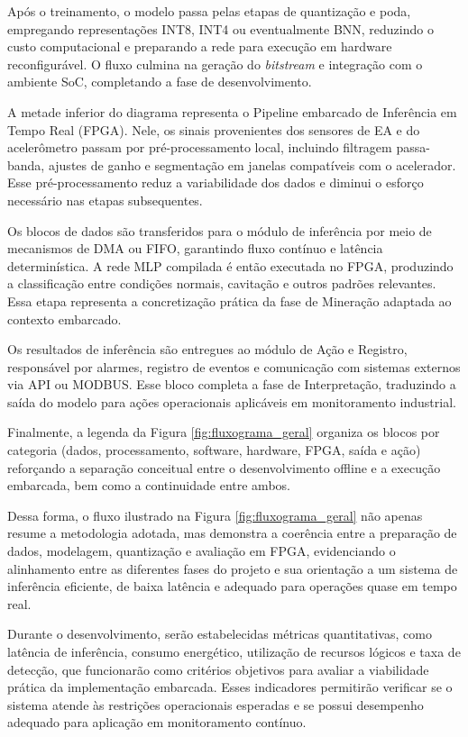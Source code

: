 Após o treinamento, o modelo passa pelas etapas de quantização e poda, empregando representações INT8, INT4 ou eventualmente BNN, reduzindo o custo computacional e preparando a rede para execução em hardware reconfigurável. O fluxo culmina na geração do \textit{bitstream} e integração com o ambiente SoC, completando a fase de desenvolvimento.

A metade inferior do diagrama representa o Pipeline embarcado de Inferência em Tempo Real (FPGA). Nele, os sinais provenientes dos sensores de EA e do acelerômetro passam por pré-processamento local, incluindo filtragem passa-banda, ajustes de ganho e segmentação em janelas compatíveis com o acelerador. Esse pré-processamento reduz a variabilidade dos dados e diminui o esforço necessário nas etapas subsequentes.

Os blocos de dados são transferidos para o módulo de inferência por meio de mecanismos de DMA ou FIFO, garantindo fluxo contínuo e latência determinística. A rede MLP compilada é então executada no FPGA, produzindo a classificação entre condições normais, cavitação e outros padrões relevantes. Essa etapa representa a concretização prática da fase de Mineração adaptada ao contexto embarcado.

Os resultados de inferência são entregues ao módulo de Ação e Registro, responsável por alarmes, registro de eventos e comunicação com sistemas externos via API ou MODBUS. Esse bloco completa a fase de Interpretação, traduzindo a saída do modelo para ações operacionais aplicáveis em monitoramento industrial.

Finalmente, a legenda da Figura \ref{fig:fluxograma_geral} organiza os blocos por categoria (dados, processamento, software, hardware, FPGA, saída e ação) reforçando a separação conceitual entre o desenvolvimento offline e a execução embarcada, bem como a continuidade entre ambos.

Dessa forma, o fluxo ilustrado na Figura \ref{fig:fluxograma_geral} não apenas resume a metodologia adotada, mas demonstra a coerência entre a preparação de dados, modelagem, quantização e avaliação em FPGA, evidenciando o alinhamento entre as diferentes fases do projeto e sua orientação a um sistema de inferência eficiente, de baixa latência e adequado para operações quase em tempo real.

Durante o desenvolvimento, serão estabelecidas métricas quantitativas, como latência de inferência, consumo energético, utilização de recursos lógicos e taxa de detecção, que funcionarão como critérios objetivos para avaliar a viabilidade prática da implementação embarcada. Esses indicadores permitirão verificar se o sistema atende às restrições operacionais esperadas e se possui desempenho adequado para aplicação em monitoramento contínuo.

